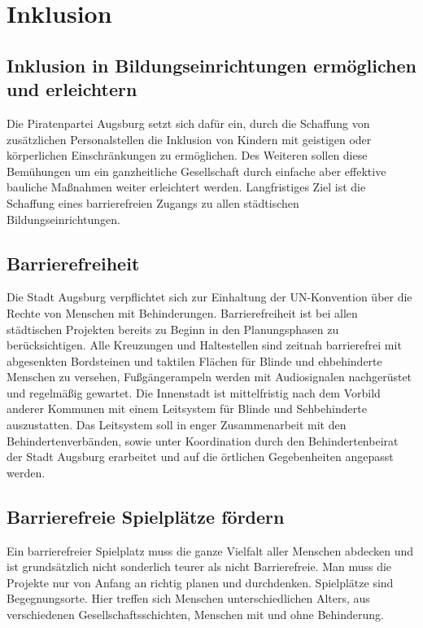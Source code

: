\chapter{Inklusion}

  \section{Inklusion in Bildungseinrichtungen ermöglichen und erleichtern}
  
  Die Piratenpartei Augsburg setzt sich dafür ein, durch die Schaffung von 
  zusätzlichen Personalstellen die Inklusion von Kindern mit geistigen oder 
  körperlichen Einschränkungen zu ermöglichen. Des Weiteren sollen diese 
  Bemühungen um ein ganzheitliche Gesellschaft durch einfache aber effektive 
  bauliche Maßnahmen weiter erleichtert werden. Langfristiges Ziel ist die 
  Schaffung eines barrierefreien Zugangs zu allen städtischen 
  Bildungseinrichtungen.
  
  \section{Barrierefreiheit}
  
  Die Stadt Augsburg verpflichtet sich zur Einhaltung der UN-Konvention über   
  die Rechte von Menschen mit Behinderungen. Barrierefreiheit ist bei allen 
  städtischen Projekten bereits zu Beginn in den Planungsphasen zu 
  berücksichtigen. Alle Kreuzungen und Haltestellen sind zeitnah barrierefrei 
  mit abgesenkten Bordsteinen und taktilen Flächen für Blinde und ehbehinderte 
  Menschen zu versehen, Fußgängerampeln werden mit Audiosignalen nachgerüstet 
  und regelmäßig gewartet. Die Innenstadt ist mittelfristig nach dem Vorbild 
  anderer Kommunen mit einem Leitsystem für Blinde und Sehbehinderte 
  auszustatten. Das Leitsystem soll in enger Zusammenarbeit mit den 
  Behindertenverbänden, sowie unter Koordination durch den Behindertenbeirat 
  der Stadt Augsburg erarbeitet und auf die örtlichen Gegebenheiten angepasst 
  werden.
  
  \section{Barrierefreie Spielplätze fördern}
  
  Ein barrierefreier Spielplatz muss die ganze Vielfalt aller Menschen 
  abdecken und ist grundsätzlich nicht sonderlich teurer als nicht   
  Barrierefreie. Man muss die Projekte nur von Anfang an richtig planen und 
  durchdenken. Spielplätze sind Begegnungsorte. Hier treffen sich Menschen 
  unterschiedlichen Alters, aus verschiedenen Gesellschaftsschichten, Menschen 
  mit und ohne Behinderung.
  
